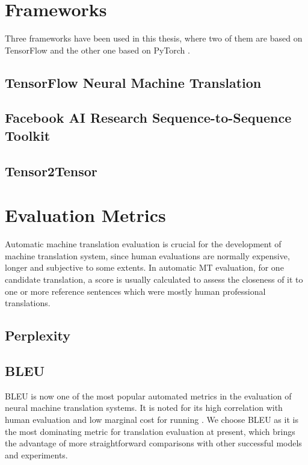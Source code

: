 \section{Frameworks}

Three frameworks have been used in this thesis, where two of them are based on TensorFlow \cite{tensorflow2015-whitepaper} and the other one based on PyTorch \cite{paszke2017automatic}.

\subsection{TensorFlow Neural Machine Translation}

\cite{luong17}

\subsection{Facebook AI Research Sequence-to-Sequence Toolkit}

\cite{gehring2017convs2s}

\subsection{Tensor2Tensor}

\cite{tensor2tensor}





\section{Evaluation Metrics}

Automatic machine translation evaluation is crucial for the development of machine translation system, since human evaluations are normally expensive, longer and subjective to some extents. In automatic MT evaluation, for one candidate translation, a score is usually calculated to assess the closeness of it to one or more reference sentences which were mostly human professional translations. 

\subsection{Perplexity}

\subsection{BLEU}

BLEU is now one of the most popular automated metrics in the evaluation of neural machine translation systems. It is noted for its high correlation with human evaluation and low marginal cost for running \cite{Papineni2002}. We choose BLEU as it is the most dominating metric for translation evaluation at present, which brings the advantage of more straightforward comparisons with other successful models and experiments.


